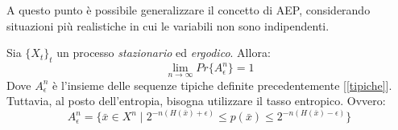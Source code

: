 A questo punto è possibile generalizzare il concetto di AEP, considerando situazioni più realistiche in cui le variabili 
non sono indipendenti.

\begin{teorema}
\mbox{}

 Sia $\{X_t\}_t$ un processo \textit{stazionario} ed \textit{ergodico}. Allora:
 \[
  \lim_{n \to \infty} Pr\{A_{\epsilon}^n\}=1
 \]
 Dove $A_{\epsilon}^n$ è l'insieme delle sequenze tipiche definite precedentemente [\ref{tipiche}]. Tuttavia, al posto dell'entropia, 
 bisogna utilizzare il tasso entropico. Ovvero:
 \[
  A_{\epsilon}^n=\{ \bar{x} \in X^n \mid 2^{-n(H(\bar{x})+\epsilon)} \le p(\bar{x}) \le 2^{-n(H(\bar{x})-\epsilon)} \}
 \]

\end{teorema}
